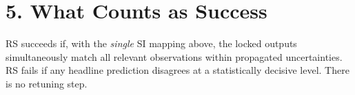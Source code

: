 \documentclass[11pt]{article}
\begin{document}
\section*{5. What Counts as Success}
RS succeeds if, with the \emph{single} SI mapping above, the locked outputs simultaneously match all relevant observations within propagated uncertainties. RS fails if any headline prediction disagrees at a statistically decisive level. There is no retuning step.
\end{document}
